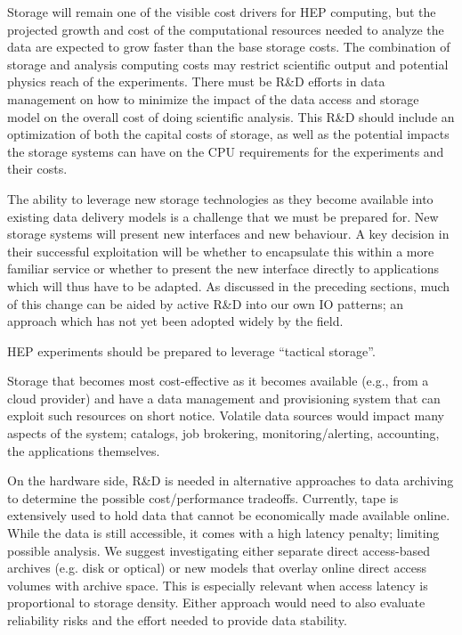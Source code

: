 \documentclass[12pt,a4paper]{article}
\begin{document}
Storage will remain one of the visible cost drivers for HEP computing,
but the projected growth and cost of the computational resources needed
to analyze the data are expected to grow faster than the base storage
costs. The combination of storage and analysis computing costs may
restrict scientific output and potential physics reach of the
experiments. There must be R\&D efforts in data management on how to
minimize the impact of the data access and storage model on the overall
cost of doing scientific analysis. This R\&D should include an
optimization of both the capital costs of storage, as well as the
potential impacts the storage systems can have on the CPU requirements
for the experiments and their costs.

The ability to leverage new storage technologies as they become
available into existing data delivery models is a challenge that we must
be prepared for. New storage systems will present new interfaces and new
behaviour. A key decision in their successful exploitation will be
whether to encapsulate this within a more familiar service or whether to
present the new interface directly to applications which will thus have
to be adapted. As discussed in the preceding sections, much of this
change can be aided by active R\&D into our own IO patterns; an approach
which has not yet been adopted widely by the field.

HEP experiments should be prepared to leverage ``tactical storage''.

Storage that becomes most cost-effective as it becomes available (e.g.,
from a cloud provider) and have a data management and provisioning
system that can exploit such resources on short notice. Volatile data
sources would impact many aspects of the system; catalogs, job
brokering, monitoring/alerting, accounting, the applications themselves.

On the hardware side, R\&D is needed in alternative approaches to data
archiving to determine the possible cost/performance tradeoffs.
Currently, tape is extensively used to hold data that cannot be
economically made available online. While the data is still accessible,
it comes with a high latency penalty; limiting possible analysis. We
suggest investigating either separate direct access-based archives (e.g.
disk or optical) or new models that overlay online direct access volumes
with archive space. This is especially relevant when access latency is
proportional to storage density. Either approach would need to also
evaluate reliability risks and the effort needed to provide data
stability.
\end{document}
